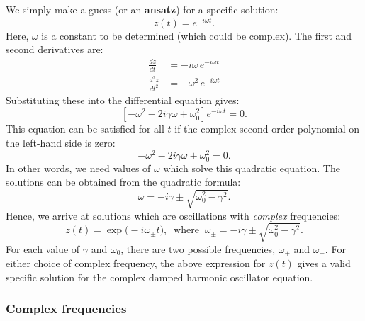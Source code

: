 \documentclass[10pt,a4paper]{article}
\begin{document}
We simply make a guess (or an \textbf{ansatz}) for a specific solution:
\begin{equation}
z(t) = e^{-i\omega t}.
\end{equation}
Here, $\omega$ is a constant to be determined (which could be
complex). The first and second derivatives are:
\begin{align}
  \frac{dz}{dt} &= -i\omega\, e^{-i\omega t} \\ \frac{d^2z}{dt^2} &= -\omega^2\, e^{-i\omega t}
\end{align}
Substituting these into the differential equation gives:
\begin{equation}
\left[-\omega^2 - 2i\gamma \omega + \omega_0^2 \right] e^{-i\omega t} = 0.
\end{equation}
This equation can be satisfied for all $t$ if the complex second-order
polynomial on the left-hand side is zero:
\begin{equation}
-\omega^2 - 2i\gamma \omega + \omega_0^2 = 0.
\end{equation}
In other words, we need values of $\omega$ which solve this quadratic
equation. The solutions can be obtained from the quadratic formula:
\begin{equation}
\omega = -i\gamma \pm \sqrt{\omega_0^2 - \gamma^2}.
\end{equation}
Hence, we arrive at solutions which are oscillations with \emph{complex}
frequencies:
\begin{equation}
z(t) = \exp\big(-i\omega_\pm t\big), \;\;\mathrm{where}\;\; \omega_\pm = -i\gamma \pm \sqrt{\omega_0^2 - \gamma^2}.
\end{equation}
For each value of $\gamma$ and $\omega_0$, there are two possible
frequencies, $\omega_+$ and $\omega_-$. For either choice of complex
frequency, the above expression for $z(t)$ gives a valid specific
solution for the complex damped harmonic oscillator equation.

\subsubsection{Complex frequencies} \label{complex-frequencies}
\end{document}

